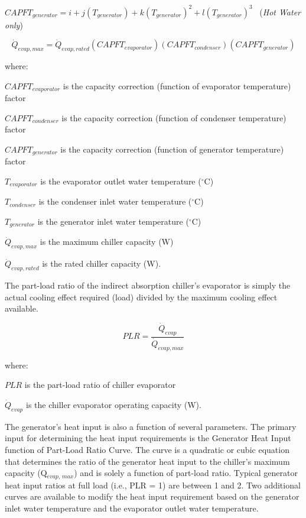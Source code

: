 \(CAPF{T_{generator}} = i + j\left( {{T_{generator}}} \right) + k{\left( {{T_{generator}}} \right)^2} + l{\left( {{T_{generator}}} \right)^3}\) ~(\emph{Hot Water only})

\begin{equation}
{\dot{Q}_{evap,max}} = {\dot{Q}_{evap,rated}}\left( {CAPF{T_{evaporator}}} \right)\left( {CAPF{T_{condenser}}} \right)\left( {CAPF{T_{generator}}} \right)
\end{equation}

where:

\(CAPF{T_{evaporator}}\) is the capacity correction (function of evaporator temperature) factor

\(CAPF{T_{condenser}}\) is the capacity correction (function of condenser temperature) factor

\(CAPF{T_{generator}}\) is the capacity correction (function of generator temperature) factor

\({T_{evaporator}}\) is the evaporator outlet water temperature (\(^{\circ}\)C)

\({T_{condenser}}\) is the condenser inlet water temperature (\(^{\circ}\)C)

\({T_{generator}}\) is the generator inlet water temperature (\(^{\circ}\)C)

\({\dot Q_{evap,max}}\) is the maximum chiller capacity (W)

\({\dot Q_{evap,rated}}\) is the rated chiller capacity (W).

The part-load ratio of the indirect absorption chiller's evaporator is simply the actual cooling effect required (load) divided by the maximum cooling effect available.

\begin{equation}
  PLR = \frac{\dot{Q}_{evap}}{\dot{Q}_{evap,max}}
\end{equation}

where:

\(PLR\) is the part-load ratio of chiller evaporator

\({\dot Q_{evap}}\) is the chiller evaporator operating capacity (W).

The generator's heat input is also a function of several parameters. The primary input for determining the heat input requirements is the Generator Heat Input function of Part-Load Ratio Curve. The curve is a quadratic or cubic equation that determines the ratio of the generator heat input to the chiller's maximum capacity (Q\(_{evap,\, max}\)) and is solely a function of part-load ratio. Typical generator heat input ratios at full load (i.e., PLR = 1) are between 1 and 2. Two additional curves are available to modify the heat input requirement based on the generator inlet water temperature and the evaporator outlet water temperature.

